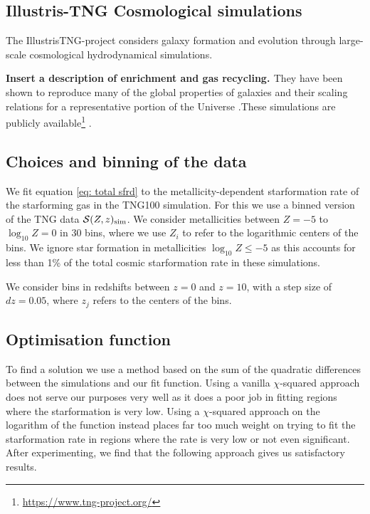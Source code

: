 \documentclass[twocolumn]{aastex631}
\newcommand{\SFRDzZ}{\ensuremath{\mathcal{S}(Z,z)}\xspace}
\newcommand{\SdM}[1]{{\color{pink}\bf{#1}}}
\begin{document}
\subsection{Illustris-TNG Cosmological simulations}

The IllustrisTNG-project considers galaxy formation and evolution through large-scale cosmological hydrodynamical simulations.

\SdM{Insert a description of enrichment and gas recycling. }
They have been shown to reproduce many of the global properties of galaxies and their scaling relations for a representative portion of the Universe \citep[e.g.][]{FirstResTNG_Naiman2018,Torrey+2021,Genel+2018,Hemler+2021}.These simulations are publicly available\footnote{ \url{https://www.tng-project.org/}} \citep{FirstResTNG_Springel2018,FirstResTNG_Marinacci2018, FirstResTNG_Nelson2018,FirstResTNG_Pillepich2018, FirstResTNG_Naiman2018}.


\subsection{Choices and binning of the data}
We fit equation \ref{eq: total sfrd} to the metallicity-dependent starformation rate of the starforming gas in the TNG100 simulation. For this we use a binned version of the TNG data $\SFRDzZ_{\rm sim}$. We consider metallicities between $Z= -5$ to $\log_{10} Z= 0$ in 30 bins, where we use $Z_i$ to refer to the logarithmic centers of the bins. We ignore star formation in metallicities $\log_{10} Z \le -5$ as this accounts for less than 1\% of the total cosmic starformation rate in these simulations.  

We consider bins in redshifts between $z=0$ and $z=10$, with a step size of $dz=0.05$, where $z_j$ refers to the centers of the bins. 

\subsection{Optimisation function}
To find a solution we use a method based on the sum of the quadratic differences between the simulations and our fit function. Using a vanilla $\chi$-squared approach does not serve our purposes very well as it does a poor job in fitting regions where the starformation is very low.  Using a $\chi$-squared approach on the logarithm of the function instead places far too much weight on trying to fit the starformation rate in regions where the rate is very low or not even significant.  After experimenting, we find that the following approach gives us satisfactory results. 
\end{document}
